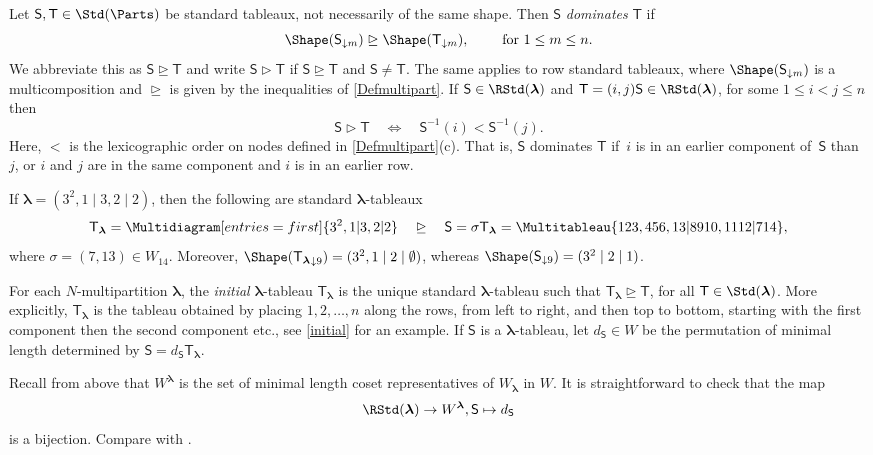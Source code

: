 \documentclass[a4paper,11pt]{amsart}
\let\gedom=\trianglerighteq
\let\gdom=\vartriangleright
\newcommand\blam{{\boldsymbol\lambda}}
\numberwithin{equation}{subsection}
\theoremstyle{definition}
\theoremstyle{theorem}
\theoremstyle{remark}
\newcommand\Sym{W}
\newcommand\bS{{\mathsf{S}}}
\newcommand\bT{{\mathsf{T}}}
\newcommand\Tlam[1][\blam]{{\mathsf{T}_{#1}}}
\begin{document}
 Let $\bS,\bT\in\Std(\Parts)$ be
 standard tableaux, not necessarily of the same shape. Then $\bS$
 \emph{dominates} $\bT$ if
 \[
        \Shape(\bS_{\downarrow m})\gedom \Shape(\bT_{\downarrow m}),
        \qquad\text{ for }1\le m\le n.
 \]
 We abbreviate this as $\bS\gedom\bT$ and write  $\bS\gdom\bT$ if $\bS\gedom\bT$ and $\bS\ne\bT$. The same applies to row standard tableaux, where $\Shape(\bS_{\downarrow m})$ is a multicomposition and $\gedom$ is given by the inequalities of \autoref{Defmultipart}. If
 $\bS\in\RStd(\blam)$ and $\bT=(i,j)\bS\in\RStd(\blam)$,
 for some $1\le i<j\le n$ then
 \begin{equation}\label{E:DominanceStep}
         \bS\gdom\bT
            \quad\Longleftrightarrow\quad \bS^{-1}(i)<\bS^{-1}(j).
 \end{equation}
 Here, $<$ is the lexicographic order on nodes defined
 in \autoref{Defmultipart}(c). That is, $\bS$ dominates $\bT$ if~$i$ is
 in an earlier component of~$\bS$ than~$j$, or $i$ and $j$ are in the
 same component and $i$ is in an earlier row.

 \begin{Example}\label{initial}
 If
 $\blam=(3^2,1\mid3,2\mid2)$, then the following are standard $\blam$-tableaux
 \[
     \Tlam=\Multidiagram[entries=first]{3^2,1|3,2|2} \quad \gedom\quad \bS=\sigma\Tlam=\Multitableau{123,456,{13}|89{10},{11}{12}|7{14}},
 \]
 where $\sigma=(7,13)\in \Sym_{14}$. Moreover, $\Shape(\Tlam_{\downarrow9})=(3^2,1\mid2\mid\emptyset)$, whereas $\Shape(\bS_{\downarrow 9})=(3^2\mid2\mid1)$.
\end{Example}





For each $N$-multipartition $\blam$, the \emph{initial}
 $\blam$-tableau $\Tlam$ is the unique standard $\blam$-tableau such
 that $\Tlam\gedom\bT$, for all $\bT\in\Std(\blam)$. More explicitly,
 $\Tlam$ is the tableau obtained by placing $1,2,\dots,n$  along
 the rows, from left to right, and then top to bottom, starting with the first component
 then the second component etc., see \autoref{initial} for an example.
If $\bS$ is a $\blam$-tableau, let $d_{\bS}\in \Sym$ be the permutation
 of minimal length determined by $\bS= d_{\bS} \Tlam$.

 Recall from above that $\Sym^\blam$ is the set of minimal length coset
 representatives of $\Sym_\blam$ in $\Sym$. It is straightforward to
 check that the map
 \begin{equation}\label{E:RowStd}
    \RStd(\blam)\to\Sym^\blam, \bS\mapsto d_\bS
 \end{equation}
 is a bijection. Compare with \cite[Chapter~3]{Mathas:ULect}.
\end{document}
